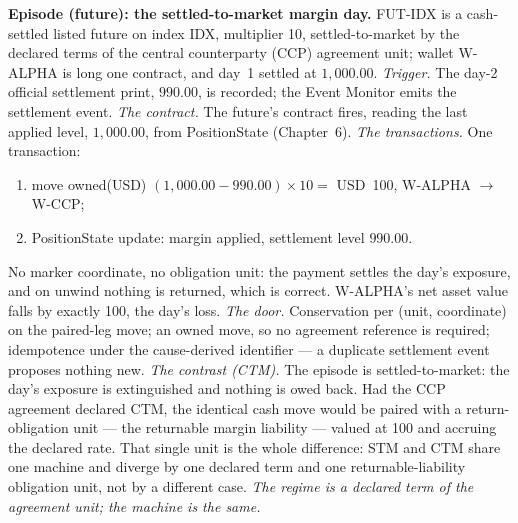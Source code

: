 \documentclass[11pt,a4paper]{article}
\newcommand{\USD}[1]{\mbox{USD~#1}}
\begin{document}
\medskip\noindent\textbf{Episode (future): the settled-to-market margin day.}
FUT-IDX is a cash-settled listed future on index IDX, multiplier 10,
settled-to-market by the declared terms of the central counterparty (CCP)
agreement unit; wallet W-ALPHA is long one contract, and day~1 settled at
$1{,}000.00$.
\emph{Trigger.} The day-2 official settlement print, $990.00$, is recorded;
the Event Monitor emits the settlement event.
\emph{The contract.} The future's contract fires, reading the last applied
level, $1{,}000.00$, from PositionState (Chapter~6).
\emph{The transactions.} One transaction:
\begin{enumerate}[label=(\arabic*),nosep]
\item move owned(USD) $(1{,}000.00-990.00)\times 10 = $ \USD{100}, W-ALPHA
$\to$ W-CCP;
\item PositionState update: margin applied, settlement level $990.00$.
\end{enumerate}
No marker coordinate, no obligation unit: the payment settles the day's
exposure, and on unwind nothing is returned, which is correct. W-ALPHA's net
asset value falls by exactly 100, the day's loss.
\emph{The door.} Conservation per (unit, coordinate) on the paired-leg move;
an owned move, so no agreement reference is required; idempotence under the
cause-derived identifier --- a duplicate settlement event proposes nothing
new.
\emph{The contrast (CTM).} The episode is settled-to-market: the day's exposure is
extinguished and nothing is owed back. Had the CCP agreement declared CTM, the
identical cash move would be paired with a return-obligation unit --- the returnable
margin liability --- valued at 100 and accruing the declared rate. That single unit is
the whole difference: STM and CTM share one machine and diverge by one declared term
and one returnable-liability obligation unit, not by a different case.
\emph{The regime is a declared term of the agreement unit; the machine is the
same.}
\end{document}
